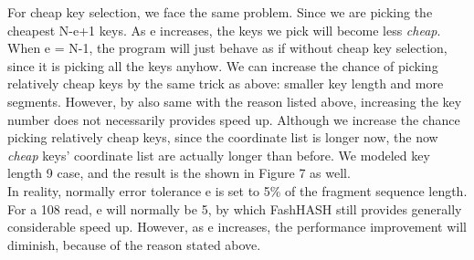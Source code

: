 For cheap key selection, we face the same problem.  Since we are picking the
cheapest N-e+1 keys. As e increases, the keys we pick will become less
\textit{cheap}. When e = N-1, the program will just behave as if without cheap
key selection, since it is picking all the keys anyhow. We can increase the
chance of picking relatively cheap keys by the same trick as above: smaller key
length and more segments. However, by also same with the reason listed above,
increasing the key number does not necessarily provides speed up. Although we
increase the chance picking relatively cheap keys, since the coordinate list is
longer now, the now \textit{cheap} keys’ coordinate list are actually longer
than before. We modeled key length 9 case, and the result is the shown in
Figure 7 as well. \\ 

In reality, normally error tolerance e is set to 5\% of the fragment sequence
length. For a 108 read, e will normally be 5, by which FashHASH still provides
generally considerable speed up. However, as e increases, the performance
improvement will diminish, because of the reason stated above. \\
